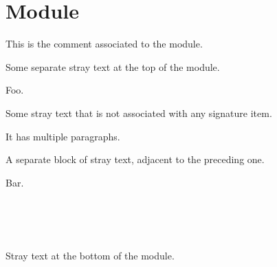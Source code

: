 \section{Module }\label{container-page-test+u+package+++ml-module-Interlude}%
\begin{flushleft}\end{flushleft}%
This is the comment associated to the module.

\begin{flushleft}\end{flushleft}%
Some separate stray text at the top of the module.

\label{container-page-test+u+package+++ml-module-Interlude-val-foo}\begin{ocamlindent}\begin{flushleft}\end{flushleft}%
Foo.\end{ocamlindent}%
\medbreak
\begin{flushleft}\end{flushleft}%
Some stray text that is not associated with any signature item.

\begin{flushleft}\end{flushleft}%
It has multiple paragraphs.

\begin{flushleft}\end{flushleft}%
A separate block of stray text, adjacent to the preceding one.

\label{container-page-test+u+package+++ml-module-Interlude-val-bar}\begin{ocamlindent}\begin{flushleft}\end{flushleft}%
Bar.\end{ocamlindent}%
\medbreak
\label{container-page-test+u+package+++ml-module-Interlude-val-multiple}\\
\label{container-page-test+u+package+++ml-module-Interlude-val-signature}\\
\label{container-page-test+u+package+++ml-module-Interlude-val-items}\\
\begin{flushleft}\end{flushleft}%
Stray text at the bottom of the module.



